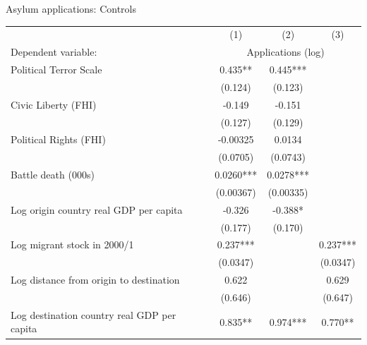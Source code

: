 \documentclass{beamer}
\begin{document}
	\begin{frame}{Asylum applications: Controls}
\vspace{-2ex}
\begin{table}
\centering
\tiny
\begin{threeparttable}
\begin{tabular}{l*{3}{c}}
\hline\hline
                    &\multicolumn{1}{c}{(1)}&\multicolumn{1}{c}{(2)}&\multicolumn{1}{c}{(3)}\\
Dependent variable:&\multicolumn{3}{c}{Applications (log)}\\
\hline
Political Terror Scale                  &     0.435** &     0.445***&                   \\
                                        &   (0.124)         &   (0.123)         &                   \\
Civic Liberty (FHI)                     &    -0.149         &    -0.151         &                   \\
                                        &   (0.127)         &   (0.129)         &                   \\
Political Rights (FHI)                  &  -0.00325         &    0.0134         &                   \\
                                        &  (0.0705)         &  (0.0743)         &                   \\
Battle death (000s)                     &    0.0260***&    0.0278***&                   \\
                                        & (0.00367)         & (0.00335)         &                   \\
Log origin country real GDP per capita  &    -0.326         &    -0.388*  &                   \\
                                        &   (0.177)         &   (0.170)         &                   \\
Log migrant stock in 2000/1             &     0.237***&                   &     0.237***\\
                                        &  (0.0347)         &                   &  (0.0347)         \\
Log distance from origin to destination &     0.622         &                   &     0.629         \\
                                        &   (0.646)         &                   &   (0.647)         \\
Log destination country real GDP per capita&     0.835** &     0.974***&     0.770** \\

\end{tabular}
\end{threeparttable}
\end{table}
\end{frame}
\end{document}
